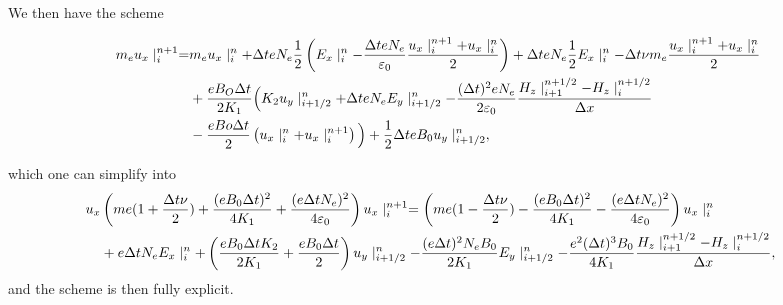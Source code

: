 We then have the scheme 

\begin{align}
m_e u_x\mid_i^{n+1}= & m_e u_x\mid_i^{n}  + \Delta t e N_e \frac{1}{2}\left( E_x\mid_i^{n} - \frac{\Delta t e N_e}{{\bf \varepsilon}_0}\frac{u_x\mid_i^{n+1} + u_x\mid_i^{n}}{2}\right) + \Delta t  e N_e \frac{1}{2}E_x\mid_i^{n} -\Delta t\nu m_e\frac{u_x\mid_i^{n+1}+u_x \mid_i^{n}}{2}\nonumber\\
&+  \frac{e B_O \Delta t}{2K_1}\Big(K_2 u_y\mid_{i+1/2}^{n} +\Delta t eN_e E_y\mid_{i+1/2}^{n} -  \frac{(\Delta t )^2 e N_e}{2{\bf \varepsilon}_0} \frac{H_z \mid_{i+1}^{n+1/2}- H_z \mid_{i}^{n+1/2}}{\Delta x}\nonumber\\
&- \frac{e Bo \Delta t}{2}\left(u_x\mid_i^{n}+u_x\mid_i^{n+1}\right)\Big)+  \frac{1}{2}\Delta teB_0u_y\mid_{i+1/2}^{n},
\label{eq:ns9}
\end{align}


which one can simplify into
\begin{align}
u_x & \left(me(1+\frac{\Delta t \nu}{2})+ \frac{(eB_0\Delta t)^2}{4K_1} + \frac{(e\Delta t N_e)^2}{4{\bf \varepsilon}_0}\right) u_x\mid_i^{n+1} 
= \left(me(1-\frac{\Delta t \nu}{2})- \frac{(eB_0\Delta t)^2}{4K_1} -\frac{(e\Delta t N_e)^2}{4{\bf \varepsilon}_0}\right) u_x\mid_i^{n} \nonumber\\
& + e \Delta t N_e E_x \mid_i^{n}  + \left( \frac{eB_0 \Delta t K_2}{2 K_1}+ \frac{e B_0 \Delta t}{2}\right) u_y\mid_{i+1/2}^{n} - \frac{(e\Delta t)^2 N_e B_0}{2K_1}E_y\mid_{i+1/2}^{n}  - \frac{e^2(\Delta t)^3 B_0}{4K_1}\frac{H_z \mid_{i+1}^{n+1/2}- H_z \mid_{i}^{n+1/2}}{\Delta x},
&\label{eq:ns10} 
\end{align}
and the scheme is then fully explicit.